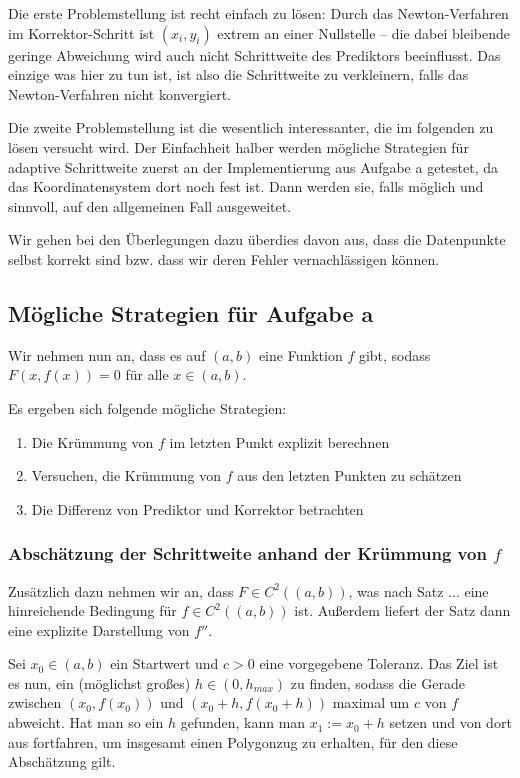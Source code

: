 \documentclass[a4paper,11pt,bibliography=totoc,listof=totoc,headinclude=true,cleardoublepage=empty,oneside]{scrartcl}
\begin{document}
Die erste Problemstellung ist recht einfach zu lösen: Durch das Newton-Verfahren im Korrektor-Schritt ist $(x_i,y_i)$ extrem an einer Nullstelle -- die dabei bleibende geringe Abweichung wird auch nicht Schrittweite des Prediktors beeinflusst. Das einzige was hier zu tun ist, ist also die Schrittweite zu verkleinern, falls das Newton-Verfahren nicht konvergiert. 

Die zweite Problemstellung ist die wesentlich interessanter, die im folgenden zu lösen versucht wird. Der Einfachheit halber werden mögliche Strategien für adaptive Schrittweite zuerst an der Implementierung aus Aufgabe a getestet, da das Koordinatensystem dort noch fest ist. Dann werden sie, falls möglich und sinnvoll, auf den allgemeinen Fall ausgeweitet.

Wir gehen bei den Überlegungen dazu überdies davon aus, dass die Datenpunkte selbst korrekt sind bzw. dass wir deren Fehler vernachlässigen können.
\subsection{Mögliche Strategien für Aufgabe a}\label{chap:5.1}
Wir nehmen nun an, dass es auf $(a,b)$ eine Funktion $f$ gibt, sodass $F(x,f(x))=0$ für alle $x \in (a,b)$. 

Es ergeben sich folgende mögliche Strategien:
\begin{enumerate}
	\item Die Krümmung von $f$  im letzten Punkt explizit berechnen
	\item Versuchen, die Krümmung von $f$ aus den letzten Punkten zu schätzen 
	\item Die Differenz von Prediktor und Korrektor betrachten
\end{enumerate}


\subsubsection{Abschätzung der Schrittweite anhand der Krümmung von $f$}\label{chap:5.1.1}

 Zusätzlich dazu nehmen wir an, dass $F \in C^2((a,b))$, was nach Satz ... eine hinreichende Bedingung für $f \in C^2((a,b))$ ist. Außerdem liefert der Satz dann eine explizite Darstellung von $f''$.  

Sei $x_0 \in (a,b)$ ein Startwert und $c>0$ eine vorgegebene Toleranz. Das Ziel ist es nun, ein (möglichst großes) $h \in (0,h_{max})$ zu finden, sodass die Gerade zwischen $(x_0,f(x_0))$ und $(x_0+h,f(x_0+h))$ maximal um $c$ von $f$ abweicht. Hat man so ein $h$ gefunden, kann man $x_1 := x_0+h$ setzen und von dort aus fortfahren, um insgesamt einen Polygonzug zu erhalten, für den diese Abschätzung gilt. 
\end{document}
